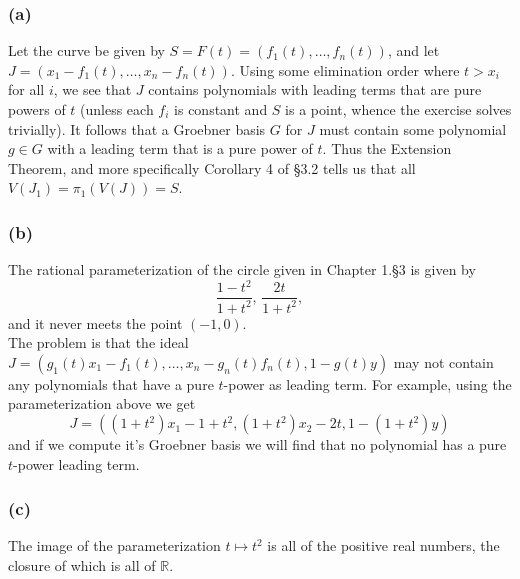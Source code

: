 \documentclass{article}
\theoremstyle{definition}
\newcommand{\R}{\mathbb{R}}
\begin{document}
\subsubsection*{(a)}

Let the curve be given by $S = F(t) = (f_1(t), \ldots, f_n(t))$, and let $J =
(x_1 - f_1(t), \ldots, x_n - f_n(t))$. Using some elimination order where $t >
x_i$ for all $i$, we see that $J$ contains polynomials with leading terms that
are pure powers of $t$ (unless each $f_i$ is constant and $S$ is a point,
whence the exercise solves trivially). It follows that a Groebner basis $G$ for
$J$ must contain some polynomial $g \in G$ with a leading term that is a pure
power of $t$. Thus the Extension Theorem, and more specifically Corollary 4 of
§3.2 tells us that all $V(J_1) = \pi_1(V(J)) = S$.

\subsubsection*{(b)}

The rational parameterization of the circle given in Chapter 1.§3 is given by 
\[
	\frac{1 - t^2}{1 + t^2}, \,
	\frac{2t}{1 + t^2},
\] 
and it never meets the point $(-1, 0)$. \\ 

The problem is that the ideal
$J = (g_1(t)x_1 - f_1(t), \ldots, x_n - g_n(t)f_n(t), 1 - g(t)y)$
may not contain any polynomials that have a pure $t$-power as leading term.
For example, using the parameterization above we get 
\[
	J = (
		(1 + t^2)x_1 - 1 + t^2,
		(1 + t^2)x_2 - 2t,
		1 - (1 + t^2)y
	)
\] 
and if we compute it's Groebner basis we will find that no polynomial has a
pure $t$-power leading term.

\subsubsection*{(c)}

The image of the parameterization $t \mapsto t^2$ is all of the positive real
numbers, the closure of which is all of $\R$.
\end{document}
